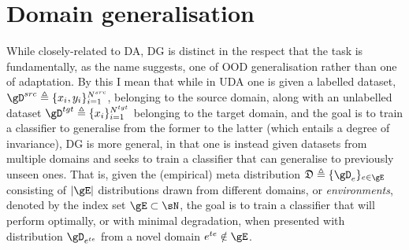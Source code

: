 \section{Domain generalisation}\label{sec:dg}
While closely-related to \ac{DA}, \acf{DG} is distinct in the respect that the task is
fundamentally, as the name suggests, one of \ac{OOD} generalisation rather than one of adaptation.
%
%
By this I mean that while in \ac{UDA} one is given a labelled dataset, \( \gD^{src} \triangleq
\{x_i, y_i \}_{i=1}^{N^{src}} \), belonging to the source domain, along with an unlabelled
dataset \( \gD^{tgt} \triangleq \{ x_i \}_{i=1}^{N^{tgt}} \) belonging to the target domain,
and the goal is to train a classifier to generalise from the former to the latter (which entails a
degree of invariance), \ac{DG} is more general, in that one is instead given datasets from multiple
domains and seeks to train a classifier that can generalise to previously unseen ones. 
%
That is, given the (empirical) meta distribution \( \mathfrak{D} \triangleq \{\gD_e \}_{e \in \gE}
\) consisting of \( |\gE| \) distributions drawn from different domains, or \emph{environments},
denoted by the index set \( \gE \subset \sN \), the goal is to train a classifier that will perform
optimally, or with minimal degradation, when presented with distribution \( \gD_{e^{te}} \) from a
novel domain \( e^{te} \notin  \gE \).

